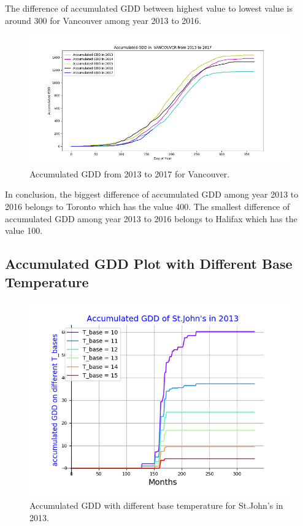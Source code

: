 \documentclass[12pt]{article}
\begin{document}
The difference of accumulated GDD between highest value to lowest value is around 300 for Vancouver among year 2013 to 2016.
\begin{center}
\begin{figure}[H]
\includegraphics[width=5.25in]{Plot/yearvan.png}




\caption{Accumulated GDD from 2013 to 2017 for Vancouver.}
\label{5.4}
\end{figure}
\end{center}

In conclusion, the biggest difference of accumulated GDD among year 2013 to 2016 belongs to Toronto which has the value 400. The smallest difference of accumulated GDD among year 2013 to 2016 belongs to Halifax which has the value 100.

\subsection{Accumulated GDD Plot with Different Base Temperature}

\begin{center}
\begin{figure}[H]
\includegraphics[width=5.25in]{Plot/differentTbase.png}




\caption{Accumulated GDD with different base temperature for St.John's in 2013.}
\label{5.5}
\end{figure}
\end{center}
\end{document}

